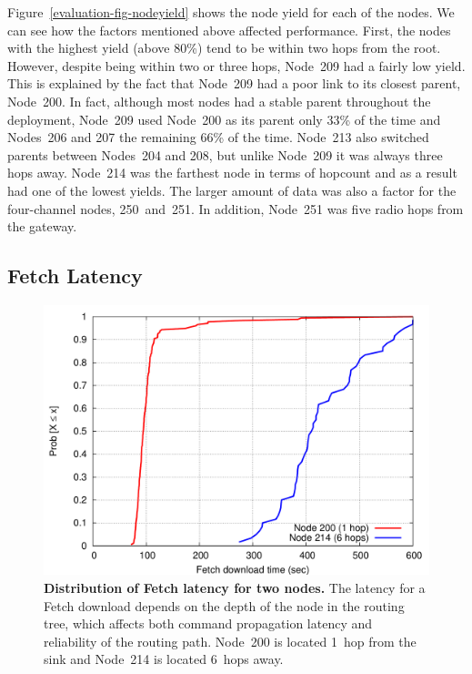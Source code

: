 Figure~\ref{evaluation-fig-nodeyield} shows the node yield for each of the
nodes. We can see how the factors mentioned above affected performance.
First, the nodes with the highest yield (above 80\%) tend to be within two
hops from the root. However, despite being within two or three hops, Node~209
had a fairly low yield. This is explained by the fact that Node~209 had a
poor link to its closest parent, Node~200. In fact, although most nodes had a
stable parent throughout the deployment, Node~209 used Node~200 as its parent
only 33\% of the time and Nodes~206 and 207 the remaining 66\% of the time.
Node~213 also switched parents between Nodes~204 and 208, but unlike Node~209
it was always three hops away. Node~214 was the farthest node in terms of
hopcount and as a result had one of the lowest yields. The larger amount of
data was also a factor for the four-channel nodes, 250~and~251. In addition,
Node~251 was five radio hops from the gateway.


\subsection{Fetch Latency}

\begin{figure}[t]
\begin{center}
\includegraphics[width=\hsize]{./3-evaluation/figs/fetchlatency.pdf}
\end{center}

\caption{\textbf{Distribution of Fetch latency for two nodes.} The latency
for a Fetch download depends on the depth of the node in the routing tree,
which affects both command propagation latency and reliability of the routing
path. Node~200 is located 1~hop from the sink and Node~214 is located 6~hops
away.}

\label{evaluation-fig-fetchlatency}
\end{figure}

